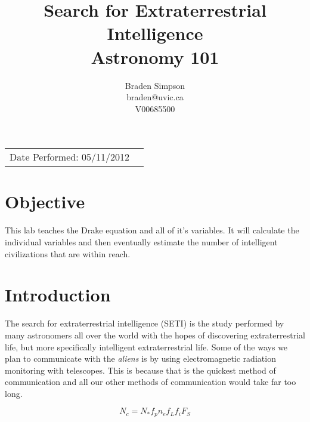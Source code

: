 \documentclass{article}
\title{Search for Extraterrestrial Intelligence \\ Astronomy 101} %
\author{Braden Simpson \\ braden@uvic.ca \\ V00685500} %
\begin{document}
\maketitle %

\begin{tabular}{lr}
Date Performed: 05/11/2012\\ %
\end{tabular}

\setlength\parindent{0pt} %
\newcommand{\sub}{\textsubscript}
\renewcommand{\labelenumi}{\alph{enumi}.} %


\section{Objective}
This lab teaches the Drake equation and all of it's variables.  It will calculate the individual variables and then eventually estimate the number of intelligent civilizations that are within reach.\\


\section{Introduction}


The search for extraterrestrial intelligence (SETI) is the study performed by many astronomers all over the world with the hopes of discovering extraterrestrial life, but more specifically intelligent extraterrestrial life.  Some of the ways we plan to communicate with the \emph{aliens} is by using electromagnetic radiation monitoring with telescopes.  This is because that is the quickest method of communication and all our other methods of communication would take far too long. 

\begin{equation}
\label{eq:drake}
N_c = N_*f_pn_ef_Lf_iF_S
\end{equation} 
\end{document}
